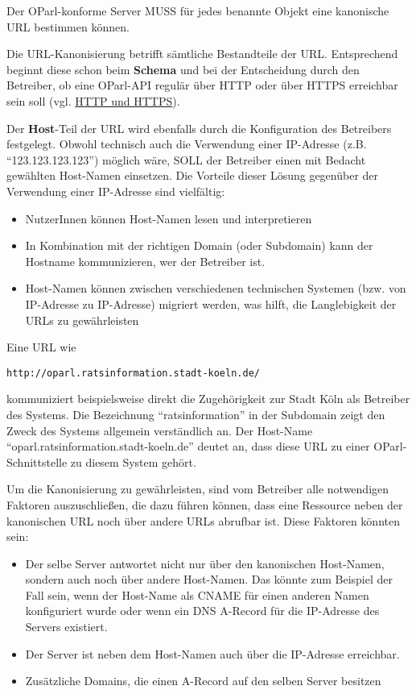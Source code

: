 \documentclass[,a4paper]{article}
\begin{document}
Der OParl-konforme Server MUSS für jedes benannte Objekt eine kanonische
URL bestimmen können.

Die URL-Kanonisierung betrifft sämtliche Bestandteile der URL.
Entsprechend beginnt diese schon beim \textbf{Schema} und bei der
Entscheidung durch den Betreiber, ob eine OParl-API regulär über HTTP
oder über HTTPS erreichbar sein soll (vgl.
\hyperref[http-und-https]{HTTP und HTTPS}).

Der \textbf{Host}-Teil der URL wird ebenfalls durch die Konfiguration
des Betreibers festgelegt. Obwohl technisch auch die Verwendung einer
IP-Adresse (z.B. ``123.123.123.123'') möglich wäre, SOLL der Betreiber
einen mit Bedacht gewählten Host-Namen einsetzen. Die Vorteile dieser
Lösung gegenüber der Verwendung einer IP-Adresse sind vielfältig:

\begin{itemize}
\itemsep1pt\parskip0pt
\item
  NutzerInnen können Host-Namen lesen und interpretieren
\item
  In Kombination mit der richtigen Domain (oder Subdomain) kann der
  Hostname kommunizieren, wer der Betreiber ist.
\item
  Host-Namen können zwischen verschiedenen technischen Systemen (bzw.
  von IP-Adresse zu IP-Adresse) migriert werden, was hilft, die
  Langlebigkeit der URLs zu gewährleisten
\end{itemize}

Eine URL wie

\begin{verbatim}
http://oparl.ratsinformation.stadt-koeln.de/
\end{verbatim}

kommuniziert beispielsweise direkt die Zugehörigkeit zur Stadt Köln als
Betreiber des Systems. Die Bezeichnung ``ratsinformation'' in der
Subdomain zeigt den Zweck des Systems allgemein verständlich an. Der
Host-Name ``oparl.ratsinformation.stadt-koeln.de'' deutet an, dass diese
URL zu einer OParl-Schnittstelle zu diesem System gehört.

Um die Kanonisierung zu gewährleisten, sind vom Betreiber alle
notwendigen Faktoren auszuschließen, die dazu führen können, dass eine
Ressource neben der kanonischen URL noch über andere URLs abrufbar ist.
Diese Faktoren könnten sein:

\begin{itemize}
\item
  Der selbe Server antwortet nicht nur über den kanonischen Host-Namen,
  sondern auch noch über andere Host-Namen. Das könnte zum Beispiel der
  Fall sein, wenn der Host-Name als CNAME für einen anderen Namen
  konfiguriert wurde oder wenn ein DNS A-Record für die IP-Adresse des
  Servers existiert.
\item
  Der Server ist neben dem Host-Namen auch über die IP-Adresse
  erreichbar.
\item
  Zusätzliche Domains, die einen A-Record auf den selben Server besitzen
\end{itemize}
\end{document}
